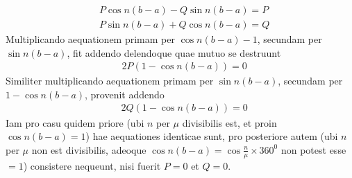 \[
\begin{aligned}
&P\cos n(b-a)-Q\sin n(b-a)=P\\[5pt]
&P\sin n(b-a)+Q\cos n(b-a)=Q
\end{aligned}
\]
Multiplicando aequationem primam per \(\cos n(b-a)-1\), secundam per \(\sin n(b-a)\),
fit addendo delendoque quae mutuo se destruunt
\[
\begin{aligned}
&2P(1-\cos n(b-a))=0
\end{aligned}
\]
Similiter multiplicando aequationem primam per \(\sin n(b-a)\), secundam per
\(1-\cos n(b-a)\), provenit addendo
\[
\begin{aligned}
&2Q(1-\cos n(b-a))=0
\end{aligned}
\]
Iam pro casu quidem priore (ubi \(n\) per \(\mu\) divisibilis est, et proin \(\cos n(b-a)=1\))
hae aequationes identicae sunt, pro posteriore autem (ubi \(n\) per \(\mu\) non est divisibilis, adeoque \(\cos n(b-a)=\cos\frac{n}{\mu}\times360^{0}\) non potest esse \(=1\)) consistere nequeunt, nisi fuerit \(P=0\) et \(Q=0\).

